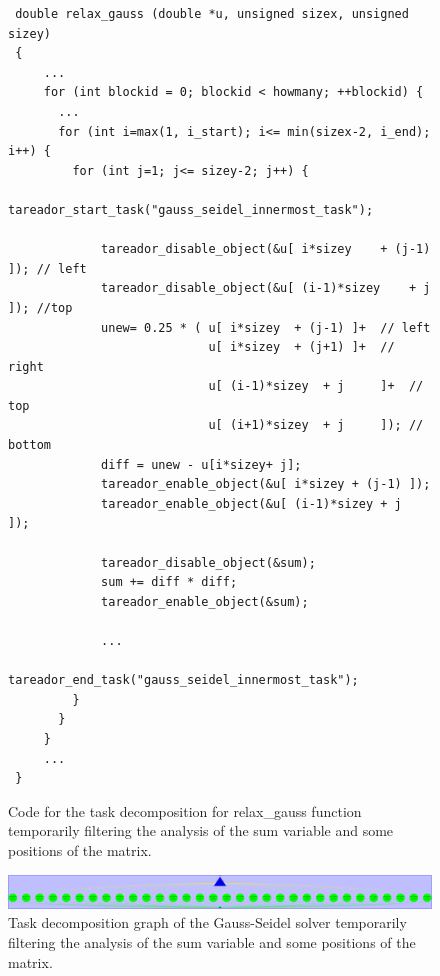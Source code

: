 \documentclass[12pt, a4paper]{article}
\begin{document}
\begin{figure}[H]
\begin{lstlisting}
 double relax_gauss (double *u, unsigned sizex, unsigned sizey)
 {
     ...
     for (int blockid = 0; blockid < howmany; ++blockid) {
       ...
       for (int i=max(1, i_start); i<= min(sizex-2, i_end); i++) {
         for (int j=1; j<= sizey-2; j++) {
			 tareador_start_task("gauss_seidel_innermost_task");
 				
			 tareador_disable_object(&u[ i*sizey	+ (j-1) ]); // left
			 tareador_disable_object(&u[ (i-1)*sizey	+ j     ]); //top
			 unew= 0.25 * ( u[ i*sizey	+ (j-1) ]+  // left
 				   			u[ i*sizey	+ (j+1) ]+  // right
				    		u[ (i-1)*sizey	+ j     ]+  // top
				    		u[ (i+1)*sizey	+ j     ]); // bottom
			 diff = unew - u[i*sizey+ j];
			 tareador_enable_object(&u[ i*sizey	+ (j-1) ]);
			 tareador_enable_object(&u[ (i-1)*sizey	+ j     ]);
 			
			 tareador_disable_object(&sum);
			 sum += diff * diff; 
			 tareador_enable_object(&sum);
 			
			 ...
			 tareador_end_task("gauss_seidel_innermost_task");
         }
       }
     }
	 ...
 }
\end{lstlisting}
\caption{Code for the task decomposition for relax\_gauss function temporarily filtering the analysis of the sum variable and some positions of the matrix.}
\end{figure}

\begin{figure}[H]
	\centering
	\includegraphics[scale=0.15]{./images/tareador-gauss-seidel-2b-sum-vector}
	\caption{Task decomposition graph of the Gauss-Seidel solver temporarily filtering the analysis of the sum variable and some positions of the matrix.}
\end{figure}

\label{sec:TDGAllDisablesGaussSeidel}
\end{document}
